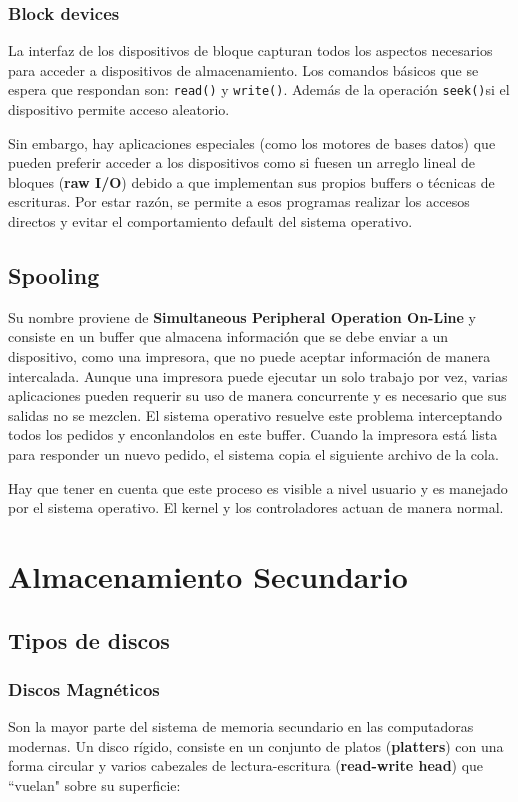 \subsubsection{Block devices}
La interfaz de los dispositivos de bloque capturan todos los aspectos necesarios para acceder a dispositivos de almacenamiento. Los comandos básicos que se espera que respondan son: \texttt{read()} y \texttt{write()}. Además de la operación \texttt{seek()}si el dispositivo permite acceso aleatorio.

Sin embargo, hay aplicaciones especiales (como los motores de bases datos) que pueden preferir acceder a los dispositivos como si fuesen un arreglo lineal de bloques (\textbf{raw I/O}) debido a que implementan sus propios buffers o técnicas de escrituras. Por estar razón, se permite a esos programas realizar los accesos directos y evitar el comportamiento default del sistema operativo.

\subsection{Spooling}
Su nombre proviene de \textbf{Simultaneous Peripheral Operation On-Line} y consiste en un buffer que almacena información que se debe enviar a un dispositivo, como una impresora, que no puede aceptar información de manera intercalada. Aunque una impresora puede ejecutar un solo trabajo por vez, varias aplicaciones pueden requerir su uso de manera concurrente y es necesario que sus salidas no se mezclen. El sistema operativo resuelve este problema interceptando todos los pedidos y enconlandolos en este buffer. Cuando la impresora está lista para responder un nuevo pedido, el sistema copia el siguiente archivo de la cola.

Hay que tener en cuenta que este proceso es visible a nivel usuario y es manejado por el sistema operativo. El kernel y los controladores actuan de manera normal.
 
\printbibliography[keyword=drivers, title=Bibliografía]

\newpage
\section{Almacenamiento Secundario}
\subsection{Tipos de discos}
\subsubsection{Discos Magnéticos}\label{discosMagneticos}
Son la mayor parte del sistema de memoria secundario en las computadoras modernas. Un disco rígido, consiste en un conjunto de platos (\textbf{platters}) con una forma circular y varios cabezales de lectura-escritura (\textbf{read-write head}) que ``vuelan" sobre su superficie:

